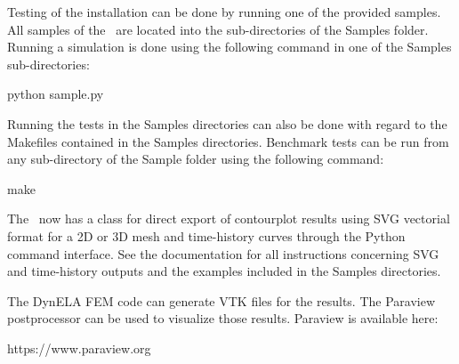 Testing of the installation can be done by running one of the provided samples. All samples of the \DynELA~are located into the sub-directories of the Samples folder. Running a simulation is done using the following command in one of the Samples sub-directories:

\begin{BashListing}[numbers=none]
python sample.py
\end{BashListing}

Running the tests in the Samples directories can also be done with regard to the Makefiles contained in the Samples directories. Benchmark tests can be run from any sub-directory of the Sample folder using the following command:

\begin{BashListing}[numbers=none]
make
\end{BashListing}

The \DynELA~now has a class for direct export of contourplot results using SVG vectorial format for a 2D or 3D mesh and time-history curves through the Python command interface. See the documentation for all instructions concerning SVG and time-history outputs and the examples included in the Samples directories.

The DynELA FEM code can generate VTK files for the results. The Paraview postprocessor can be used to visualize those results. Paraview is available here:

\hspace*{1cm}\textsf{\hspace*{1cm}\textsf{https://www.paraview.org}}
